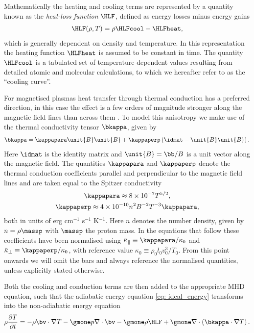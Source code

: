 Mathematically the heating and cooling terms are represented by a quantity known as the \emph{heat-loss function} $\HLF$, defined as energy losses minus energy gains
\begin{equation} \label{eq: cooling_simple}
  \HLF(\rho, T) = \rho \HLFcool - \HLFheat,
\end{equation}
which is generally dependent on density and temperature. In this representation the heating function $\HLFheat$ is assumed to be constant in time. The quantity $\HLFcool$ is a tabulated set of temperature-dependent values resulting from detailed atomic and molecular calculations, to which we hereafter refer to as the ``cooling curve''.

For magnetised plasmas heat transfer through thermal conduction has a preferred direction, in this case the effect is a few orders of magnitude stronger along the magnetic field lines than across them \citep{book_spitzer}. To model this anisotropy we make use of the thermal conductivity tensor $\bkappa$, given by
\begin{equation} \label{eq: conduction}
  \bkappa = \kappapara\unit{B}\unit{B} + \kappaperp\left(\idmat - \unit{B}\unit{B}\right).
\end{equation}
Here $\idmat$ is the identity matrix and $\unit{B} = \bb/B$ is a unit vector along the magnetic field. The quantities $\kappapara$ and $\kappaperp$ denote the thermal conduction coefficients parallel and perpendicular to the magnetic field lines and are taken equal to the Spitzer conductivity \citep{book_priest}
\begin{equation} \label{eq: thermal_coeffs}
  \begin{gathered}
    \kappapara \approx 8 \times 10^{-7} T^{5/2}, \\
    \kappaperp \approx 4 \times 10^{-10} n^2 B^{-2} T^{-3} \kappapara,
  \end{gathered}
\end{equation}
both in units of erg cm$^{-1}$ s$^{-1}$ K$^{-1}$. Here $n$ denotes the number density, given by $n = \rho \massp$ with $\massp$ the proton mass. In the equations that follow these coefficients have been normalised using
$\bar{\kappa}_\parallel \equiv \kappapara / \kappa_0$ and $\bar{\kappa}_\perp \equiv \kappaperp / \kappa_0$, with reference value $\kappa_0 \equiv \rho_0 l_0 v_0^3 / T_0$. From this point onwards we will omit the bars and always reference the normalised quantities, unless explicitly stated otherwise.

Both the cooling and conduction terms are then added to the appropriate MHD equation, such that the adiabatic energy equation \eqref{eq: ideal_energy} transforms into the non-adiabatic energy equation
\begin{equation} \label{eq: nonad_energy}
  \rho \frac{\partial T}{\partial t} =
    -\rho \bv \cdot \nabla T
    -\gmone p \nabla \cdot \bv
    -\gmone \rho \HLF
    +\gmone \nabla \cdot \left(\bkappa \cdot \nabla T\right).
\end{equation}


